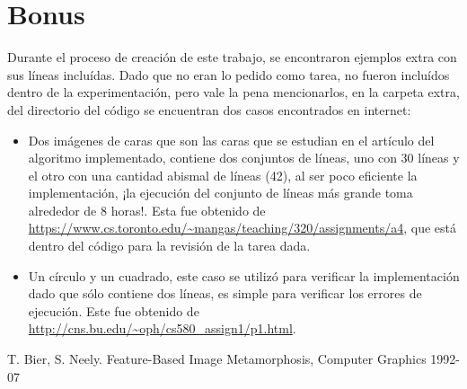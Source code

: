 \documentclass[conference]{IEEEtran}
\begin{document}
\section*{Bonus}
	Durante el proceso de creación de este trabajo, se encontraron ejemplos extra con sus líneas incluídas. Dado que no eran lo pedido como tarea, no fueron incluídos dentro de la experimentación, pero vale la pena mencionarlos, en la carpeta extra, del directorio del código se encuentran dos casos encontrados en internet:
	\begin{itemize}
	\item Dos imágenes de caras que son las caras que se estudian en el artículo del algoritmo implementado, contiene dos conjuntos de líneas, uno con 30 líneas y el otro con una cantidad abismal de líneas (42), al ser poco eficiente la implementación, ¡la ejecución del conjunto de líneas más grande toma alrededor de 8 horas!. Esta fue obtenido de \url{https://www.cs.toronto.edu/~mangas/teaching/320/assignments/a4}, que está dentro del código para la revisión de la tarea dada.
	\item Un círculo y un cuadrado, este caso se utilizó para verificar la implementación dado que sólo contiene dos líneas, es simple para verificar los errores de ejecución. Este fue obtenido de \url{http://cns.bu.edu/~oph/cs580_assign1/p1.html}.
	
	\end{itemize}

		
	
\begin{thebibliography}{99}
	  T. Bier, S. Neely. Feature-Based Image Metamorphosis, Computer Graphics 1992-07

\end{thebibliography}
\end{document}
